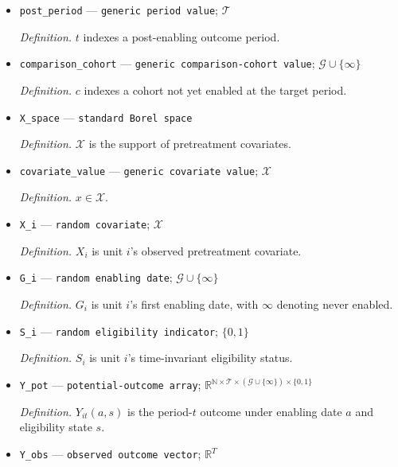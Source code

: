 \documentclass{article}
\begin{document}
\begin{itemize}
  \par\smallskip\noindent\emph{Definition.} \(g\in\mathcal G\) indexes a cohort whose effect is targeted and always has the observed baseline \(g-1\in\mathcal T\).
  \item \texttt{post\_\allowbreak{}period} --- \texttt{generic period value}; \(\mathcal T\)
  \par\smallskip\noindent\emph{Definition.} \(t\) indexes a post-enabling outcome period.
  \item \texttt{comparison\_\allowbreak{}cohort} --- \texttt{generic comparison-\allowbreak{}cohort value}; \(\mathcal G\cup\{\infty\}\)
  \par\smallskip\noindent\emph{Definition.} \(c\) indexes a cohort not yet enabled at the target period.
  \item \texttt{X\_\allowbreak{}space} --- \texttt{standard Borel space}
  \par\smallskip\noindent\emph{Definition.} \(\mathcal X\) is the support of pretreatment covariates.
  \item \texttt{covariate\_\allowbreak{}value} --- \texttt{generic covariate value}; \(\mathcal X\)
  \par\smallskip\noindent\emph{Definition.} \(x\in\mathcal X\).
  \item \texttt{X\_\allowbreak{}i} --- \texttt{random covariate}; \(\mathcal X\)
  \par\smallskip\noindent\emph{Definition.} \(X_i\) is unit \(i\)'s observed pretreatment covariate.
  \item \texttt{G\_\allowbreak{}i} --- \texttt{random enabling date}; \(\mathcal G\cup\{\infty\}\)
  \par\smallskip\noindent\emph{Definition.} \(G_i\) is unit \(i\)'s first enabling date, with \(\infty\) denoting never enabled.
  \item \texttt{S\_\allowbreak{}i} --- \texttt{random eligibility indicator}; \(\{0,1\}\)
  \par\smallskip\noindent\emph{Definition.} \(S_i\) is unit \(i\)'s time-invariant eligibility status.
  \item \texttt{Y\_\allowbreak{}pot} --- \texttt{potential-\allowbreak{}outcome array}; \(\mathbb R^{\mathbb N\times\mathcal T\times(\mathcal G\cup\{\infty\})\times\{0,1\}}\)
  \par\smallskip\noindent\emph{Definition.} \(Y_{it}(a,s)\) is the period-\(t\) outcome under enabling date \(a\) and eligibility state \(s\).
  \item \texttt{Y\_\allowbreak{}obs} --- \texttt{observed outcome vector}; \(\mathbb R^T\)

\end{itemize}
\end{document}

